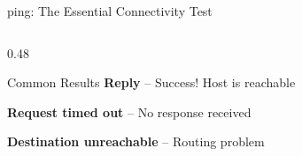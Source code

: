 \documentclass[aspectratio=169]{beamer}  %
\begin{document}
\begin{frame}{ping: The Essential Connectivity Test}
\begin{columns}[T]
\begin{column}{0.48\textwidth}
            \vspace{0.3em}
            \begin{alertblock}{Common Results}
                \small
                \textbf{Reply} -- Success! Host is reachable
                
                \vspace{0.1em}
                \textbf{Request timed out} -- No response received
                
                \vspace{0.1em}
                \textbf{Destination unreachable} -- Routing problem
            \end{alertblock}
        \end{column}
    \end{columns}
\end{frame}
\end{document}
